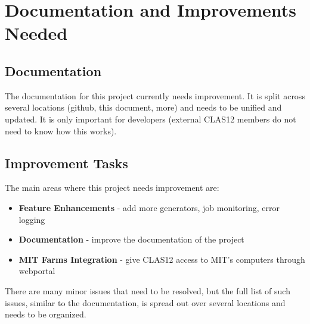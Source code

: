 \section{Documentation and Improvements Needed}
\subsection{Documentation}
The documentation for this project currently needs improvement. It is split across several locations (github, this document, more) and needs to be unified and updated. It is only important for developers (external CLAS12 members do not need to know how this works).
\subsection{Improvement Tasks}
The main areas where this project needs improvement are:
  \begin{itemize}
    \item \textbf{Feature Enhancements} - add more generators, job monitoring, error logging
    \item \textbf{Documentation} - improve the documentation of the project
    \item \textbf{MIT Farms Integration} - give CLAS12 access to MIT's computers through webportal
  \end{itemize}
  
  There are many minor issues that need to be resolved, but the full list of such issues, similar to the documentation, is spread out over several locations and needs to be organized.